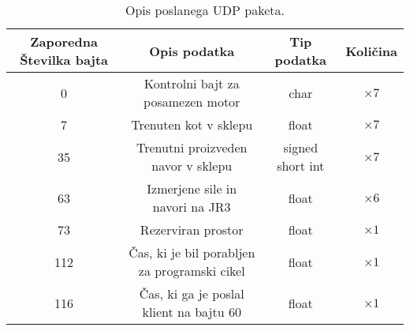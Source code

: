 
\begin{table}[h]
	\centering
	\begin{footnotesize}
		\begin{tabular}{|c c c c |}
		Zaporedna \v{S}tevilka bajta & Opis podatka & Tip podatka &  Koli\v{c}ina\\ \hline
		0 & Kontrolni bajt za posamezen motor & char & $\times 7$ \\
		7 & Trenuten kot v sklepu & float & $\times 7$ \\
		35 & Trenutni proizveden navor v sklepu & signed short int & $\times 7$ \\
		63 & Izmerjene sile in navori na JR3 & float & $\times 6$ \\
		73 & Rezerviran prostor & float & $\times 1$\\
		112 & \v{C}as, ki je bil porabljen za programski cikel & float & $\times 1$\\
		116 & \v{C}as, ki ga je poslal klient na bajtu 60 & float & $\times 1$\\ \hline
		\end{tabular}
	\end{footnotesize}
	\caption{Opis poslanega UDP paketa.}
	\label{table:udp-reply}
\end{table}
